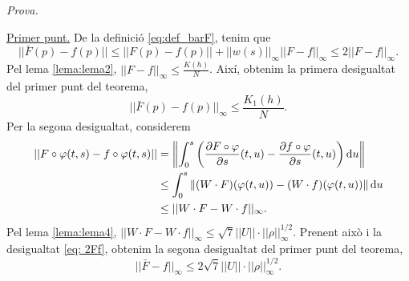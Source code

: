 {
\color{green!50!black}
\textit{Prova.}

\underline{Primer punt.}
De la definició \ref{eq:def_barF}, tenim que
\begin{equation}\label{eq: 2Ff}
    ||\bar F(p)-f(p)||\le||F(p)-f(p)|| + ||w(s)||_\infty ||F-f||_\infty \le 2||F-f||_\infty.
\end{equation}
Pel lema \ref{lema:lema2}, $||F-f||_\infty\le\frac{K(h)}{N}$. Així, obtenim la primera desigualtat del primer punt del teorema,
\begin{equation*}
    ||\bar F(p)-f(p)||_\infty\le\frac{K_1(h)}{N}.
\end{equation*}
Per la segona desigualtat, considerem
\begin{align*}
    ||F\circ\varphi(t,s)-f\circ\varphi(t,s)|| &= \left\|\int_0^s \left( \frac{\partial F\circ\varphi}{\partial s}(t,u) -  \frac{\partial f\circ\varphi}{\partial s}(t,u)\right)\text du\right\|\\
    &\le \int_0^s\left\| 
        (W\cdot F)(\varphi(t,u)) - (W\cdot f)(\varphi(t,u))
    \right\|\text du\\
    &\le ||W\cdot F-W\cdot f||_\infty.
\end{align*}
Pel lema \ref{lema:lema4}, $||W\cdot F-W\cdot f||_\infty\le\sqrt7||U||\cdot||\rho||^{1/2}_\infty$. Prenent això i la desigualtat \ref{eq: 2Ff}, obtenim la segona desigualtat del primer punt del teorema,
\begin{equation*}
    ||\bar F-f||_\infty\le 2\sqrt7||U||\cdot||\rho||^{1/2}_\infty.
\end{equation*}

}
